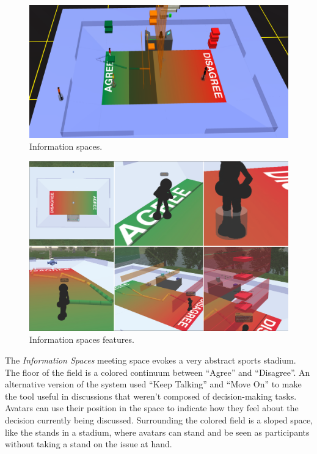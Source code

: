 \documentclass{tufte-handout}
\begin{document}
\begin{figure}[tp]
	\includegraphics{figures/information-spaces-overview.png}
	\caption{Information spaces.}
	\label{fig:information-spaces-overview}
\end{figure}

\begin{figure}[tp]
	\includegraphics{figures/information-spaces-features.png}
	\caption{Information spaces features.}
	\label{fig:information-spaces-features}
\end{figure}


The \emph{Information Spaces} meeting space evokes a very abstract sports stadium. The floor of the field is a colored continuum between ``Agree'' and ``Disagree''. An alternative version of the system used ``Keep Talking'' and ``Move On'' to make the tool useful in discussions that weren't composed of decision-making tasks. Avatars can use their position in the space to indicate how they feel about the decision currently being discussed. Surrounding the colored field is a sloped space, like the stands in a stadium, where avatars can stand and be seen as participants without taking a stand on the issue at hand.
\end{document}
